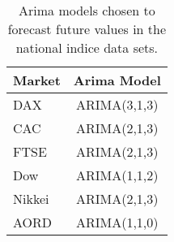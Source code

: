 \begin{table}[ht]
\centering
\caption[Arima models chosen for the indice data sets]{Arima models chosen to forecast future values in the national indice data sets.} 
\label{tab:chp_ts_arima_models_chp6}
\begin{tabular}{lc}
  \toprule Market & Arima Model \\ 
  \midrule DAX & ARIMA(3,1,3)                    \\ 
  CAC & ARIMA(2,1,3)                    \\ 
  FTSE & ARIMA(2,1,3)                    \\ 
  Dow & ARIMA(1,1,2)                    \\ 
  Nikkei & ARIMA(2,1,3)                    \\ 
  AORD & ARIMA(1,1,0)                    \\ 
   \bottomrule \end{tabular}
\end{table}
